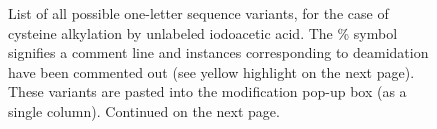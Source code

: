 \documentclass[letterpaper,10pt,oneside,english]{sphinxmanual}
\begin{document}
\begin{figure}[H]
\centering
\capstart

\noindent{}
\caption{List of all possible one-letter sequence variants, for the case of cysteine alkylation by unlabeled iodoacetic acid.  The \% symbol signifies a comment line and instances corresponding to deamidation have been commented out (see yellow highlight on the next page).  These variants are pasted into the modification pop-up box (as a single column).  Continued on the next page.}\label{\detokenize{applicationnote:id3}}\end{figure}



\renewcommand{\indexname}{Index}
\printindex
\end{document}

